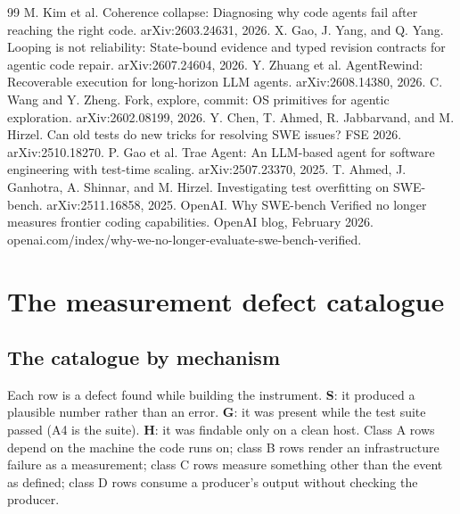 \documentclass{article}
\begin{document}
\begin{thebibliography}{99}
 M. Kim et al. Coherence collapse: Diagnosing why code agents fail after reaching the right code. arXiv:2603.24631, 2026.
 X. Gao, J. Yang, and Q. Yang. Looping is not reliability: State-bound evidence and typed revision contracts for agentic code repair. arXiv:2607.24604, 2026.
 Y. Zhuang et al. AgentRewind: Recoverable execution for long-horizon LLM agents. arXiv:2608.14380, 2026.
 C. Wang and Y. Zheng. Fork, explore, commit: OS primitives for agentic exploration. arXiv:2602.08199, 2026.
 Y. Chen, T. Ahmed, R. Jabbarvand, and M. Hirzel. Can old tests do new tricks for resolving SWE issues? FSE 2026. arXiv:2510.18270.
 P. Gao et al. Trae Agent: An LLM-based agent for software engineering with test-time scaling. arXiv:2507.23370, 2025.
 T. Ahmed, J. Ganhotra, A. Shinnar, and M. Hirzel. Investigating test overfitting on SWE-bench. arXiv:2511.16858, 2025.
 OpenAI. Why SWE-bench Verified no longer measures frontier coding capabilities. OpenAI blog, February 2026. openai.com/index/why-we-no-longer-evaluate-swe-bench-verified.
\end{thebibliography}

\appendix
\section{The measurement defect catalogue}

\subsection{The catalogue by mechanism}

Each row is a defect found while building the instrument. \textbf{S}: it produced a plausible number rather than an error. \textbf{G}: it was present while the test suite passed (A4 is the suite). \textbf{H}: it was findable only on a clean host. Class A rows depend on the machine the code runs on; class B rows render an infrastructure failure as a measurement; class C rows measure something other than the event as defined; class D rows consume a producer's output without checking the producer.
\end{document}

